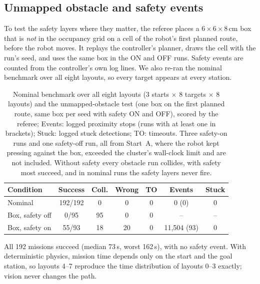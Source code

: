 \subsection{Unmapped obstacle and safety events}
\label{sec:obstacle}
To test the safety layers where they matter, the referee places a $6{\times}6{\times}8$\,cm box that is \emph{not} in the occupancy grid on a cell of the robot's first planned route, before the robot moves. It replays the controller's planner, draws the cell with the run's seed, and uses the same box in the ON and OFF runs. Safety events are counted from the controller's own log lines. We also re-ran the nominal benchmark over all eight layouts, so every target appears at every station.

\begin{table}[tbp]
  \centering\small
  \setlength{\tabcolsep}{2.5pt}
  \begin{tabular}{@{}lcccccc@{}}
    \toprule
    Condition & Success & Coll. & Wrong & TO & Events & Stuck \\
    \midrule
    Nominal & 192/192 & 0 & 0 & 0 & 0 (0) & 0 \\
    Box, safety off & 0/95 & 95 & 0 & 0 & -- & -- \\
    Box, safety on & 55/93 & 18 & 20 & 0 & 11,504 (93) & 0 \\
    \bottomrule
  \end{tabular}
  \caption{Nominal benchmark over all eight layouts (3 starts $\times$ 8 targets $\times$ 8 layouts) and the unmapped-obstacle test (one box on the first planned route, same box per seed with safety ON and OFF), scored by the referee; Events: logged proximity stops (runs with at least one in brackets); Stuck: logged stuck detections; TO: timeouts. Three safety-on runs and one safety-off run, all from Start~A, where the robot kept pressing against the box, exceeded the cluster's wall-clock limit and are not included. Without safety every obstacle run collides, with safety most succeed, and in nominal runs the safety layers never fire.}
  \label{tab:obstacle}
\end{table}

 All 192 missions succeed (median 73\,s, worst 162\,s), with no safety event. With deterministic physics, mission time depends only on the start and the goal station, so layouts 4--7 reproduce the time distribution of layouts 0--3 exactly; vision never changes the path.

